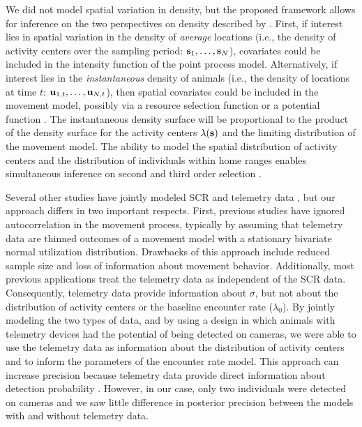 \documentclass[12pt]{article}
\newcommand{\bs}{{\bf s}}
\newcommand{\bu}{{\bf u}}
\begin{document}
We did not model spatial variation in density, but the proposed
framework allows for inference on the two perspectives on density
described by \citet[pg. 308]{royle_etal:2014}. First, if interest lies
in spatial variation in the density of \emph{average} locations (i.e., 
the density of activity centers over the sampling period: $\bs_1,
\dots, \bs_N$), covariates could be included in the intensity function
of the point process model. Alternatively, if interest lies in the
\emph{instantaneous} density of animals (i.e., the density of
locations at time $t$: $\bu_{1,t}, \dots, \bu_{N,t}$), then spatial
covariates could be included in the movement model, possibly via a
resource selection function
\citep{manly_etal:2002,johnson_etal:2008,forester_etal:2009,royle_etal:2013mee}
or a potential function
\citep{brillinger:2010,hooten_etal:2019}. The 
instantaneous density surface will be proportional to the product of
the density surface for the activity centers $\lambda(\bs)$ and the
limiting distribution of the movement model. 
The ability to model the spatial distribution of activity centers and
the distribution of individuals within home ranges enables
simultaneous inference on second and third order selection
\citep{johnson:1980,royle_etal:2013mee}.   


Several other studies have jointly modeled SCR and telemetry data
\citep{royle_etal:2013mee,whittington_etal:2018,linden_etal:2018},
but our approach differs in two important respects. First, previous
studies have ignored autocorrelation in the movement process,
typically by assuming that telemetry data are thinned outcomes of
a movement model with a stationary bivariate normal utilization
distribution. Drawbacks of this approach include reduced sample size
and loss of information about movement behavior.  Additionally, most
previous applications treat the telemetry data as independent of the
SCR data. Consequently, telemetry data provide information about
$\sigma$, but not about the distribution of activity centers or the
baseline encounter rate ($\lambda_0$). By 
jointly modeling the two types of data, and by using a design in which
animals with telemetry devices had the potential of being detected on
cameras, we were able to use the telemetry data as information about
the distribution of activity centers and to inform the parameters of
the encounter rate model. This approach can increase precision because
telemetry data provide direct information about detection probability
\citep{sollmann_etal:2013jae,sollmann_etal:2013ecol,murphy_etal:2019}.
However, in our case, only two individuals 
were detected on cameras and we saw little difference in posterior
precision between the models with and without telemetry data. 
\end{document}
